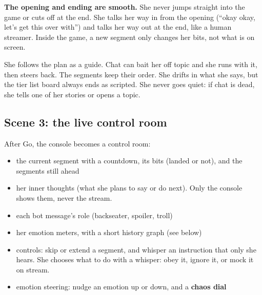 \documentclass[11pt,a4paper]{article}
\begin{document}
\textbf{The opening and ending are smooth.} She never jumps straight into the game or cuts off at the end. She talks her way in from the opening (``okay okay, let's get this over with'') and talks her way out at the end, like a human streamer. Inside the game, a new segment only changes her bits, not what is on screen.

She follows the plan as a guide. Chat can bait her off topic and she runs with it, then steers back. The segments keep their order. She drifts in what she says, but the tier list board always ends as scripted. She never goes quiet: if chat is dead, she tells one of her stories or opens a topic.

\subsection{Scene 3: the live control room}
After Go, the console becomes a control room:
\begin{itemize}
\item the current segment with a countdown, its bits (landed or not), and the segments still ahead
\item her inner thoughts (what she plans to say or do next). Only the console shows them, never the stream.
\item each bot message's role (backseater, spoiler, troll)
\item her emotion meters, with a short history graph (see below)
\item controls: skip or extend a segment, and whisper an instruction that only she hears. She chooses what to do with a whisper: obey it, ignore it, or mock it on stream.
\item emotion steering: nudge an emotion up or down, and a \textbf{chaos dial}
\end{itemize}
\end{document}

